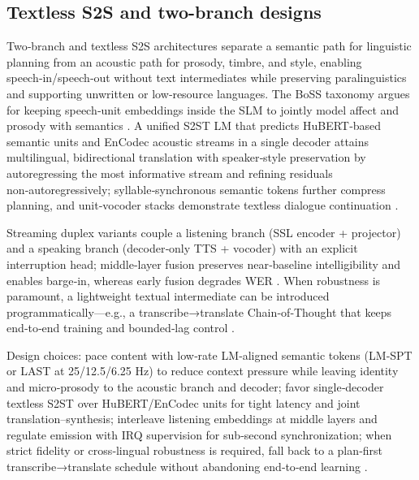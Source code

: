 \documentclass{article}
\begin{document}
\subsection{Textless S2S and two-branch designs} \label{subsec:Textless S2S and two-branch designs}
Two‑branch and textless S2S architectures separate a semantic path for linguistic planning from an acoustic path for prosody, timbre, and style, enabling speech‑in/speech‑out without text intermediates while preserving paralinguistics and supporting unwritten or low‑resource languages. The BoSS taxonomy argues for keeping speech‑unit embeddings inside the SLM to jointly model affect and prosody with semantics \cite{wang2025bossbeyondsemanticspeech}. A unified S2ST LM that predicts HuBERT‑based semantic units and EnCodec acoustic streams in a single decoder attains multilingual, bidirectional translation with speaker‑style preservation by autoregressing the most informative stream and refining residuals non‑autoregressively; syllable‑synchronous semantic tokens further compress planning, and unit‑vocoder stacks demonstrate textless dialogue continuation \cite{peng2024mslms2stmultitaskspeechlanguagemodeltext,baade2024syllablelmlearningcoarsesemanticunitsspe,nakata2024jchatjapaneselargescalespokendialoguecor}.

Streaming duplex variants couple a listening branch (SSL encoder + projector) and a speaking branch (decoder‑only TTS + vocoder) with an explicit interruption head; middle‑layer fusion preserves near‑baseline intelligibility and enables barge‑in, whereas early fusion degrades WER \cite{ma2024languagemodelcanlistenwhilespeaking}. When robustness is paramount, a lightweight textual intermediate can be introduced programmatically—e.g., a transcribe→translate Chain‑of‑Thought that keeps end‑to‑end training and bounded‑lag control \cite{guo2025streamuniachievingstreamingspeechtransla}.

Design choices: pace content with low‑rate LM‑aligned semantic tokens (LM‑SPT or LAST at 25/12.5/6.25 Hz) to reduce context pressure while leaving identity and micro‑prosody to the acoustic branch and decoder; favor single‑decoder textless S2ST over HuBERT/EnCodec units for tight latency and joint translation–synthesis; interleave listening embeddings at middle layers and regulate emission with IRQ supervision for sub‑second synchronization; when strict fidelity or cross‑lingual robustness is required, fall back to a plan‑first transcribe→translate schedule without abandoning end‑to‑end learning \cite{jo2025lmsptalignedsemanticdistillationspeechto,turetzky2024lastlanguagemodelawarespeechtokenization,entry2025towardjointlanguagemodelingspeechunitste,ma2024languagemodelcanlistenwhilespeaking,guo2025streamuniachievingstreamingspeechtransla,qian2025prosodylmuncoveringemergingprosodyproces}.
\end{document}
